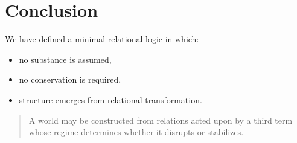 \documentclass[11pt]{article}
\begin{document}
\section{Conclusion}

We have defined a minimal relational logic in which:
\begin{itemize}
\item no substance is assumed,
\item no conservation is required,
\item structure emerges from relational transformation.
\end{itemize}

\begin{quote}
A world may be constructed from relations acted upon by a third term whose regime determines whether it disrupts or stabilizes.
\end{quote}
\end{document}
